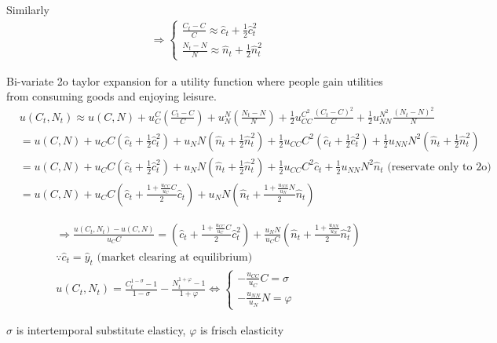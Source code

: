Similarly
\begin{align}
& \Rightarrow
\begin{cases}
\frac{C_t -C}{C}\approx \hat c_t +\frac{1}{2} \hat c_t^2
\\\frac{N_t -N}{N}\approx \hat n_t +\frac{1}{2} \hat n_t^2
\end{cases}
\end{align}

Bi-variate 2o taylor expansion for a utility function where people gain utilities from consuming goods and enjoying leisure.
\begin{align}
& u(C_t,N_t)\approx u(C,N)+u_C^C (\frac{C_t -C}{C})+u_N^N(\frac{N_t -N}{N})+\frac{1}{2}u_{CC}^{C^2}\frac{(C_t-C)^2}{C}+\frac{1}{2}u_{NN}^{N^2}\frac{(N_t-N)^2}{N}
\\& = u(C,N)+u_C C(\hat c_t +\frac{1}{2}\hat c_t^2)+u_N N(\hat n_t +\frac{1}{2} \hat n_t^2)+\frac{1}{2}u_{CC} C^2(\hat c_t +\frac{1}{2}\hat c_t^2)+\frac{1}{2}u_{NN} N^2(\hat n_t +\frac{1}{2}\hat n_t^2)
\\& = u(C,N)+u_C C(\hat c_t +\frac{1}{2}\hat c_t^2)+u_N N(\hat n_t +\frac{1}{2} \hat n_t^2)+\frac{1}{2}u_{CC} C^2 \hat c_t+\frac{1}{2}u_{NN} N^2 \hat n_t
\text{ (reservate only to 2o)}
\\& = u(C,N)+u_C C(\hat c_t + \frac{1+\frac{u_{CC}}{u_C}C}{2}\hat c_t)+u_N N(\hat n_t + \frac{1+\frac{u_{NN}}{u_N}N}{2}\hat n_t)
\end{align}

\begin{align}
& \Rightarrow \frac{u(C_t,N_t)-u(C,N)}{u_C C}
= (\hat c_t + \frac{1+\frac{u_{CC}}{u_C}C}{2}\hat c_t^2)+\frac{u_N N}{u_C C}(\hat n_t + \frac{1+\frac{u_{NN}}{u_N}}{2}\hat n^2_t)
\\& \because \hat c_t = \hat y_t \text{ (market clearing at equilibrium)}
\\&
u(C_t,N_t)=\frac{C_t^{1-\sigma}-1}{1-\sigma}-\frac{N_t^{1+\varphi}-1}{1+\varphi}
\iff
\begin{cases}
-\frac{u_{CC}}{u_C}C=\sigma\\
-\frac{u_{NN}}{u_N}N=\varphi
\end{cases}
\end{align}

\begin{blueblock}
\begin{note}
\end{note}
$\sigma$ is intertemporal substitute elasticy, $\varphi$ is frisch elasticity
\end{blueblock}

